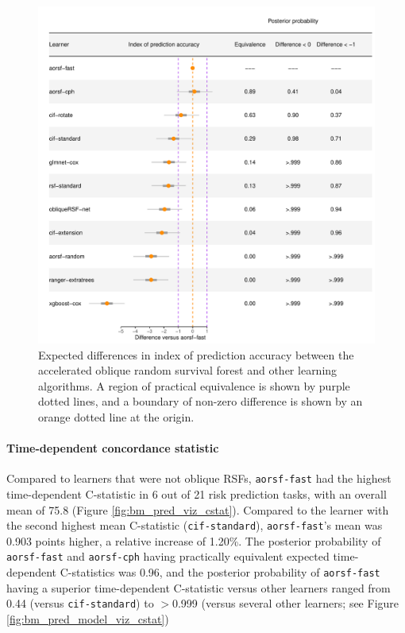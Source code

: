 \documentclass[12pt]{article}\usepackage[]{graphicx}\usepackage[]{xcolor}
\makeatletter
\def\maxwidth{ %
  \ifdim\Gin@nat@width>\linewidth
    \linewidth
  \else
    \Gin@nat@width
  \fi
}
\newenvironment{knitrout}{}{} %
\makeatother
\begin{document}
\begin{knitrout}
\color{fgcolor}\begin{figure}
\includegraphics[width=\maxwidth]{figure/bm_pred_model_viz_ibs-1} \caption[Expected differences in index of prediction accuracy between the accelerated oblique random survival forest and other learning algorithms]{Expected differences in index of prediction accuracy between the accelerated oblique random survival forest and other learning algorithms. A region of practical equivalence is shown by purple dotted lines, and a boundary of non-zero difference is shown by an orange dotted line at the origin.}\label{fig:bm_pred_model_viz_ibs}
\end{figure}

\end{knitrout}

\paragraph{Time-dependent concordance statistic}




Compared to learners that were not oblique RSFs, \texttt{aorsf-fast} had the highest time-dependent C-statistic in 6 out of 21 risk prediction tasks, with an overall mean of 75.8 (Figure \ref{fig:bm_pred_viz_cstat}). Compared to the learner with the second highest mean C-statistic (\texttt{cif-standard}), \texttt{aorsf-fast}'s mean was 0.903 points higher, a relative increase of 1.20\%. The posterior probability of \texttt{aorsf-fast} and \texttt{aorsf-cph} having practically equivalent expected time-dependent C-statistics was 0.96, and the posterior probability of \texttt{aorsf-fast} having a superior time-dependent C-statistic versus other learners ranged from 0.44 (versus \texttt{cif-standard}) to $>$0.999 (versus several other learners; see Figure \ref{fig:bm_pred_model_viz_cstat})
\end{document}
